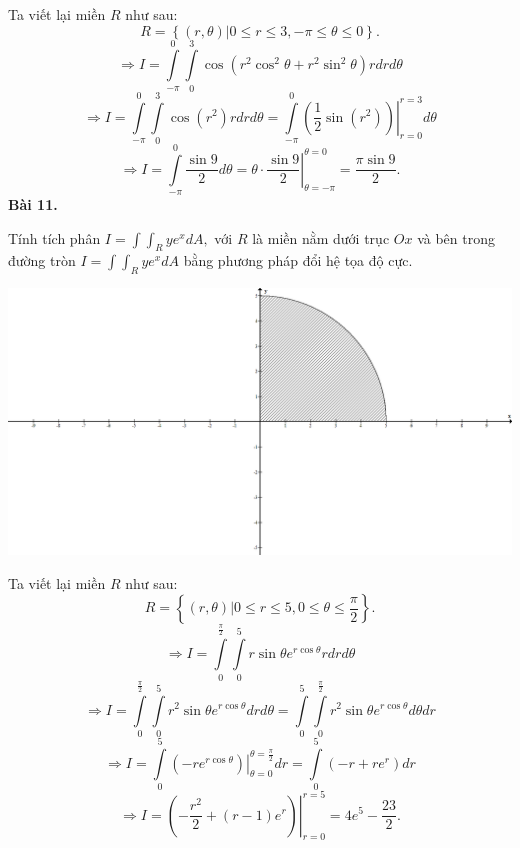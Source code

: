 \documentclass[12pt,a4paper]{article}
\begin{document}
Ta viết lại miền \(R\) như sau: 
\[R = \left\{ {\left. {\left( {r,\theta } \right)} \right|0 \leqslant r \leqslant 3, - \pi  \leqslant \theta  \leqslant 0} \right\}.\]
\[ \Rightarrow I = \int\limits_{ - \pi }^0 {\int\limits_0^3 {\cos \left( {{r^2}{{\cos }^2}\theta  + {r^2}{{\sin }^2}\theta } \right)rdrd\theta } } \]
\[ \Rightarrow I = \int\limits_{ - \pi }^0 {\int\limits_0^3 {\cos \left( {{r^2}} \right)rdrd\theta } }  = \int\limits_{ - \pi }^0 {\left. {\left( {\frac{1}{2}\sin \left( {{r^2}} \right)} \right)} \right|} _{r = 0}^{r = 3}d\theta \]
\[ \Rightarrow I = \int\limits_{ - \pi }^0 {\frac{{\sin 9}}{2}} d\theta  = \theta  \cdot \left. {\frac{{\sin 9}}{2}} \right|_{\theta  =  - \pi }^{\theta  = 0} = \frac{{\pi \sin 9}}{2}.\]
\textbf{Bài 11.}
\begin{mybox}
Tính tích phân \(I = \int {\int_R {y{e^x}} } dA,\) với \(R\) là miền nằm dưới trục \(Ox\) và bên trong đường tròn \(I = \int {\int_R {y{e^x}} } dA\) bằng phương pháp đổi hệ tọa độ cực.
\end{mybox}
\begin{center}
\includegraphics[scale=0.3]{c3_2}
\end{center}
Ta viết lại miền \(R\) như sau:
\[R = \left\{ {\left. {\left( {r,\theta } \right)} \right|0 \leqslant r \leqslant 5,0 \leqslant \theta  \leqslant \frac{\pi }{2}} \right\}.\]
\[ \Rightarrow I = \int\limits_0^{\frac{\pi }{2}} {\int\limits_0^5 {r\sin \theta {e^{r\cos \theta }}} } rdrd\theta \]
\[ \Rightarrow I = \int\limits_0^{\frac{\pi }{2}} {\int\limits_0^5 {{r^2}\sin \theta {e^{r\cos \theta }}} } drd\theta  = \int\limits_0^5 {\int\limits_0^{\frac{\pi }{2}} {{r^2}\sin \theta {e^{r\cos \theta }}d\theta dr} } \]
\[ \Rightarrow I = \int\limits_0^5 {\left. {\left( { - r{e^{r\cos \theta }}} \right)} \right|} _{\theta  = 0}^{\theta  = \frac{\pi }{2}}dr = \int\limits_0^5 {\left( { - r + r{e^r}} \right)} dr\]
\[ \Rightarrow I = \left. {\left( { - \frac{{{r^2}}}{2} + \left( {r - 1} \right){e^r}} \right)} \right|_{r = 0}^{r = 5} = 4{e^5} - \frac{{23}}{2}.\]
\end{document}
